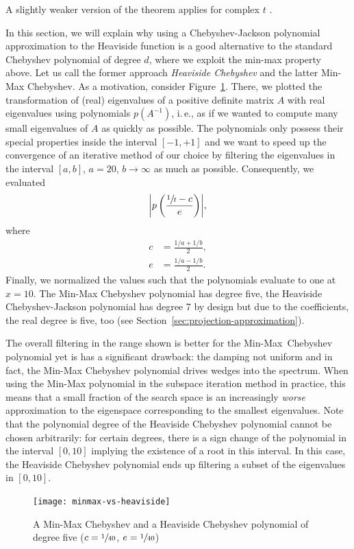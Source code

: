 \documentclass[%
	paper=a4,
	fontsize=10pt,
	DIV11,BCOR10mm,
	numbers=noenddot,
	abstract=yes
]{scrartcl}
\DeclarePairedDelimiter\abs{\lvert}{\rvert}
\theoremstyle{definition}
\begin{document}
A slightly weaker version of the theorem applies for complex $t$
\cite[Theorem~1]{Fischer1989}.

In this section, we will explain why using a Chebyshev-Jackson polynomial
approximation to the Heaviside function is a good alternative to the standard
Chebyshev polynomial of degree $d$, where we exploit the min-max property above.
Let us call the former approach \emph{Heaviside Chebyshev} and the latter
{Min-Max Chebyshev}. As a motivation, consider
Figure~\ref{fig:minmax-vs-heaviside}. There, we plotted the transformation of
(real) eigenvalues of a positive definite matrix $A$ with real eigenvalues using
polynomials $p(A^{-1})$, i.\,e., as if we wanted to compute many small
eigenvalues of $A$ as quickly as possible. The polynomials only possess their
special properties inside the interval $[-1, +1]$ and we want to speed up the
convergence of an iterative method of our choice by filtering the eigenvalues in
the interval $[a, b]$, $a = 20$, $b \rightarrow \infty$ as much as possible.
Consequently, we evaluated
\[ \abs*{p \left(\frac{\sfrac{1}{t} - c}{e}\right)}, \]
where
\begin{align*}
	c &= \frac{1/a + 1/b}{2}, \\
	e &= \frac{1/a - 1/b}{2}.
\end{align*}
Finally, we normalized the values such that the polynomials evaluate to one at
$x = 10$. The Min-Max Chebyshev polynomial has degree five, the Heaviside
Chebyshev-Jackson polynomial has degree 7 by design but due to the coefficients,
the real degree is five, too (see Section~\ref{sec:projection-approximation}).

The overall filtering in the range shown is better for the Min-Max~Chebyshev
polynomial yet is has a significant drawback: the damping not uniform and in
fact, the Min-Max Chebyshev polynomial drives wedges into the spectrum. When
using the Min-Max polynomial in the subspace iteration method in practice, this
means that a small fraction of the search space is an increasingly \emph{worse}
approximation to the eigenspace corresponding to the smallest eigenvalues. Note
that the polynomial degree of the Heaviside Chebyshev polynomial cannot be
chosen arbitrarily: for certain degrees, there is a sign change of the
polynomial in the interval $[0, 10]$ implying the existence of a root in this
interval. In this case, the Heaviside Chebyshev polynomial ends up filtering a
subset of the eigenvalues in $[0, 10]$.

\begin{figure}
	\centering
	\texttt{[image: minmax-vs-heaviside]}
	\caption{A Min-Max Chebyshev and a Heaviside Chebyshev
	polynomial of degree five ($c = \sfrac{1}{40}$, $e = \sfrac{1}{40}$)}
	\label{fig:minmax-vs-heaviside}
\end{figure}
\end{document}

